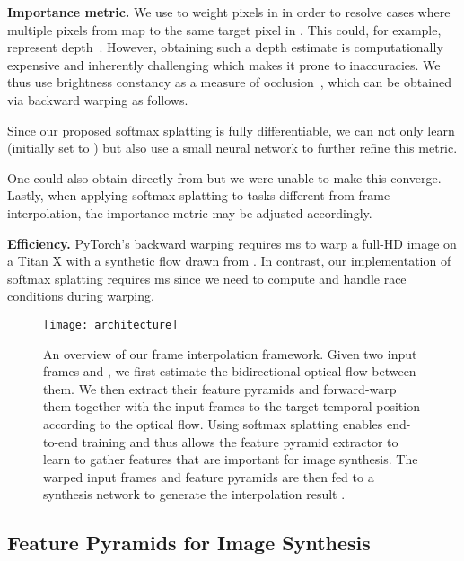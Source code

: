 \documentclass[10pt,twocolumn,letterpaper]{article}
\begin{document}
\vspace{0.05in}
\noindent\textbf{Importance metric.} We use  to weight pixels in  in order to resolve cases where multiple pixels from  map to the same target pixel in . This  could, for example, represent depth~\cite{Bao_CVPR_2019}. However, obtaining such a depth estimate is computationally expensive and inherently challenging which makes it prone to inaccuracies. We thus use brightness constancy as a measure of occlusion~\cite{Baker_IJCV_2011}, which can be obtained via backward warping  as follows.

Since our proposed softmax splatting is fully differentiable, we can not only learn  (initially set to ) but also use a small neural network  to further refine this metric.

One could also obtain  directly from  but we were unable to make this  converge. Lastly, when applying softmax splatting to tasks different from frame interpolation, the importance metric may be adjusted accordingly.

\vspace{0.05in}
\noindent\textbf{Efficiency.} PyTorch's backward warping requires  ms to warp a full-HD image on a Titan X with a synthetic flow drawn from . In contrast, our implementation of softmax splatting requires  ms since we need to compute  and handle race conditions during warping.

\begin{figure*}\centering
    \vspace{-0.1cm}\texttt{[image: architecture]}\vspace{-0.1cm}
	\caption{An overview of our frame interpolation framework. Given two input frames  and , we first estimate the bidirectional optical flow between them. We then extract their feature pyramids and forward-warp them together with the input frames to the target temporal position  according to the optical flow. Using softmax splatting enables end-to-end training and thus allows the feature pyramid extractor to learn to gather features that are important for image synthesis. The warped input frames and feature pyramids are then fed to a synthesis network to generate the interpolation result .}\vspace{-0.3cm}
	\label{fig:architecture}
\end{figure*}

\subsection{Feature Pyramids for Image Synthesis}
\end{document}
